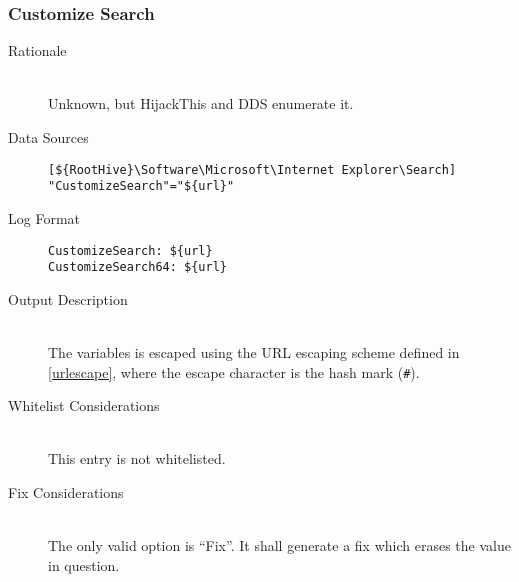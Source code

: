 \subsubsection{Customize Search}
\begin{description}
\item[Rationale] \hfill \\
Unknown, but HijackThis and DDS enumerate it.

\item[Data Sources] \hfill
\vspace{-\baselineskip}
\begin{verbatim}
[${RootHive}\Software\Microsoft\Internet Explorer\Search]
"CustomizeSearch"="${url}"
\end{verbatim}
\item[Log Format] \hfill
\vspace{-\baselineskip}
\begin{verbatim}
CustomizeSearch: ${url}
CustomizeSearch64: ${url}
\end{verbatim}
\item[Output Description] \hfill \\
The variables  is escaped using the URL escaping
scheme defined in \ref{urlescape}, where the escape character is the hash mark
(\verb|#|).
\item[Whitelist Considerations] \hfill \\
This entry is not whitelisted.
\item[Fix Considerations] \hfill \\
The only valid option is ``Fix''. It shall generate a fix which erases the value
in question.
\end{description}

